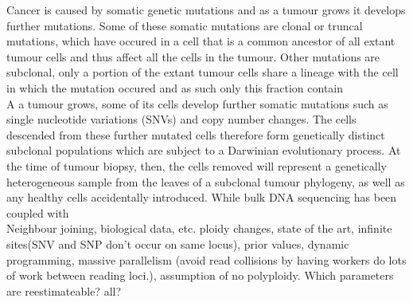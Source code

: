 \documentclass[../main.tex]{subfiles}
\begin{document}
Cancer is caused by somatic genetic mutations and as a tumour grows it develops further mutations. Some of these somatic mutations are clonal or truncal mutations, which have occured in a cell that is a common ancestor of all extant tumour cells and thus affect all the cells in the tumour. Other mutations are subclonal, only a portion of the extant tumour cells share a lineage with the cell in which the mutation occured and as such only this fraction contain\\

A a tumour grows, some of its cells develop further somatic mutations such as single nucleotide variations (SNVs) and copy number changes. The cells descended from these further mutated cells therefore form genetically distinct subclonal populations which are subject to a Darwinian evolutionary process. At the time of tumour biopsy, then, the cells removed will represent a genetically heterogeneous sample from the leaves of a subclonal tumour phylogeny, as well as any healthy cells accidentally introduced. While bulk DNA sequencing has been coupled with\\

Neighbour joining, biological data, etc. ploidy changes, state of the art, infinite sites(SNV and SNP don't occur on same locus), prior values, dynamic programming, massive parallelism (avoid read collisions by having workers do lots of work between reading loci.), assumption of no polyploidy. Which parameters are reestimateable? all?
 
\end{document}
